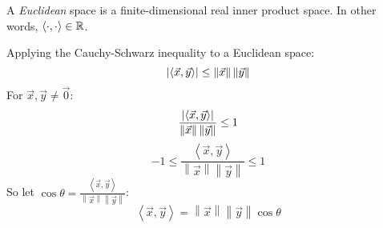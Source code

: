 \documentclass[letterpaper,12pt,fleqn]{article}
\newcommand{\vx}{\vec{x}}
\newcommand{\vy}{\vec{y}}
\newcommand{\vo}{\vec{0}}
\newcommand{\norm}[1]{\left\|#1\right\|}
\newcommand{\inner}[2]{\left<#1,#2\right>}
\renewcommand{\o}{\theta}
\begin{document}
\bigskip

\begin{definition}[Euclidean]
  A \emph{Euclidean} space is a finite-dimensional real inner product space.
  In other words, $\inner{\cdot}{\cdot}\in\R$.
\end{definition}

Applying the Cauchy-Schwarz inequality to a Euclidean space:
\[\abs{\inner{\vx}{\vy}}\le\norm{\vx}\norm{\vy}\]
For $\vx,\vy\ne\vo$:
\[\frac{\abs{\inner{\vx}{\vy}}}{\norm{\vx}\norm{\vy}}\le1\]
\[-1\le\frac{\inner{\vx}{\vy}}{\norm{\vx}\norm{\vy}}\le1\]
So let $\cos\o=\frac{\inner{\vx}{\vy}}{\norm{\vx}\norm{\vy}}$:
\[\inner{\vx}{\vy}=\norm{\vx}\norm{\vy}\cos\o\]
\end{document}
